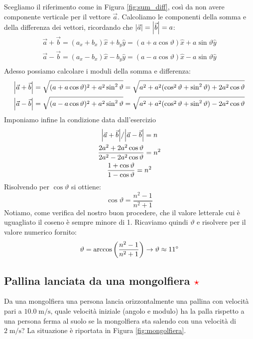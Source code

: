 \documentclass[12pt,a4paper]{book}
\newcommand{\rstar}{ \textcolor{red}{$\star$}}
\begin{document}
Scegliamo il riferimento come in Figura \ref{fig:sum_diff}, così da non avere componente verticale per il vettore $\vec{a}$. Calcoliamo le componenti della somma e della differenza dei vettori, ricordando che $\qty|\vec{a}|=\qty|\vec{b}|=a$:
%
\begin{gather*}
\vec{a} + \vec{b} = (a_x + b_x)\hat{x} + b_y\hat{y} = (a+a\cos\vartheta)\hat{x}+a\sin\vartheta\hat{y}  \\
\vec{a} - \vec{b} = (a_x - b_x)\hat{x} - b_y\hat{y} = (a-a\cos\vartheta)\hat{x}-a\sin\vartheta\hat{y} \\
\end{gather*} 
%
Adesso possiamo calcolare i moduli della somma e differenza: 
%
\begin{gather*}
\qty|\vec{a} + \vec{b}| = \sqrt{(a+a\cos\vartheta)^2 + a^2\sin^2\vartheta} = \sqrt{a^2+a^2(\cos^2\vartheta+\sin^2\vartheta)+2a^2\cos\vartheta}  \\
\qty|\vec{a} - \vec{b}| = \sqrt{(a-a\cos\vartheta)^2 + a^2\sin^2\vartheta} = \sqrt{a^2+a^2(\cos^2\vartheta+\sin^2\vartheta)-2a^2\cos\vartheta} \\
\end{gather*} 
%
Imponiamo infine la condizione data dall'esercizio
%
\begin{gather*}
\qty|\vec{a} + \vec{b}|/\qty|\vec{a} - \vec{b}|=n \\
\frac{2a^2+2a^2\cos\vartheta}{2a^2-2a^2\cos\vartheta} = n^2\\
\frac{1+\cos\vartheta}{1-\cos\vartheta}=n^2
\end{gather*} 
%
Risolvendo per $\cos\vartheta$ si ottiene:
%
\begin{equation*}
\cos\vartheta=\frac{n^2-1}{n^2+1}
\end{equation*}
%
Notiamo, come verifica del nostro buon procedere, che il valore letterale cui è uguagliato il coseno è sempre minore di 1.
Ricaviamo quindi $\vartheta$ e risolvere per il valore numerico fornito: 
%
\begin{equation*}
\vartheta=\arccos\qty(\frac{n^2-1}{n^2+1})\rightarrow \vartheta \approx 11\degree
\end{equation*}


\subsection{Pallina lanciata da una mongolfiera \rstar}
Da una mongolfiera una persona lancia orizzontalmente una pallina con velocità pari a $10.0\;\text{m/s}$, quale velocità iniziale (angolo e modulo) ha la palla rispetto a una persona ferma al suolo se la mongolfiera sta salendo con una velocità di $2\;\text{m/s}$? La situazione è riportata in Figura \ref{fig:mongolfiera}.
\end{document}
